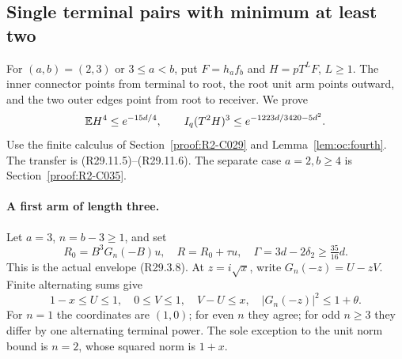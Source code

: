 \subsection{Single terminal pairs with minimum at least two}
\label{proof:R2-C031}
For \((a,b)=(2,3)\) or \(3\le a<b\), put
\(F=h_af_b\) and \(H=pT^LF\), \(L\ge1\). The inner connector points
from terminal to root, the root unit arm points outward, and the two
outer edges point from root to receiver. We prove
\[
 \mathbb E H^4\le e^{-15d/4},\qquad
 I_q(T^2H)^3\le e^{-1223d/3420-5d^2}.
\]
Use the finite calculus of Section~\ref{proof:R2-C029} and
Lemma~\ref{lem:oc:fourth}. The transfer is
(R29.11.5)--\allowbreak(R29.11.6).
The separate case \(a=2,b\ge4\) is Section~\ref{proof:R2-C035}.

\paragraph{A first arm of length three.}
Let \(a=3\), \(n=b-3\ge1\), and set
\begin{equation}\tag{R31.8.1}\label{eq:oc:R31:8.1}
 R_0=B^3G_n(-B)u,\quad R=R_0+\tau u,\quad
 \Gamma=3d-2\delta_2\ge\tfrac{35}{16}d.
\end{equation}
This is the actual envelope (R29.3.8). At \(z=i\sqrt x\), write
\(G_n(-z)=U-zV\). Finite alternating sums give
\begin{equation}\tag{R31.8.2}\label{eq:oc:R31:8.2}
 1-x\le U\le1,\quad0\le V\le1,\quad V-U\le x,\quad
 |G_n(-z)|^2\le1+\theta.
\end{equation}
For \(n=1\) the coordinates are \((1,0)\); for even \(n\) they
agree; for odd \(n\ge3\) they differ by one alternating terminal
power. The sole exception to the unit norm bound is \(n=2\), whose
squared norm is \(1+x\).

